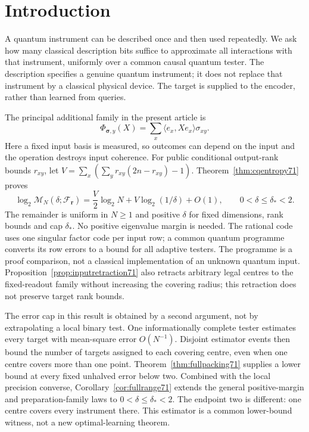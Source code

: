 \section{Introduction}
A quantum instrument can be described once and then used repeatedly.
We ask how many classical description bits suffice to approximate
all interactions with that instrument, uniformly over a common
causal quantum tester. The description specifies a genuine quantum
instrument; it does not replace that instrument by a classical
physical device. The target is supplied to the encoder, rather than
learned from queries.


The principal additional family in the present article is
\[
 \Phi_{\boldsymbol\sigma,y}(X)
   =\sum_x\langle e_x,Xe_x\rangle\sigma_{xy}.
\]
Here a fixed input basis is measured, so outcomes can depend on the
input and the operation destroys input coherence. For public conditional
output-rank bounds $r_{xy}$, let
$V=\sum_x(\sum_y r_{xy}(2n-r_{xy})-1)$. Theorem~\ref{thm:cqentropy71}
proves
\[
 \log_2\mathcal M_N(\delta;\mathcal F_{\boldsymbol r})
 =\frac V2\log_2N+V\log_2(1/\delta)+O(1),
 \qquad 0<\delta\le\delta_*<2.
\]
The remainder is uniform in $N\ge1$ and positive $\delta$ for fixed
dimensions, rank bounds and cap $\delta_*$. No positive eigenvalue
margin is needed. The rational code uses one singular factor code per
input row; a common quantum programme converts its row errors to a
bound for all adaptive testers. The programme is a proof comparison,
not a classical implementation of an unknown quantum input.
Proposition~\ref{prop:inputretraction71} also retracts arbitrary legal
centres to the fixed-readout family without increasing the covering
radius; this retraction does not preserve target rank bounds.

The error cap in this result is obtained by a second argument, not by
extrapolating a local binary test. One informationally complete tester
estimates every target with mean-square error $O(N^{-1})$. Disjoint
estimator events then bound the number of targets assigned to each
covering centre, even when one centre covers more than one point.
Theorem~\ref{thm:fullpacking71} supplies a lower bound at every fixed
unhalved error below two. Combined with the local precision converse,
Corollary~\ref{cor:fullrange71} extends the general positive-margin and
preparation-family laws to $0<\delta\le\delta_*<2$. The endpoint two
is different: one centre covers every instrument there. This estimator
is a common lower-bound witness, not a new optimal-learning theorem.

